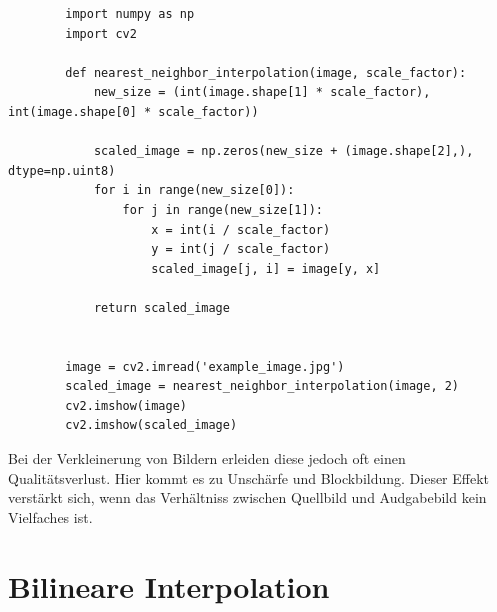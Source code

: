        \begin{acronym}
        \end{acronym}
        \begin{lstlisting}
        import numpy as np
        import cv2
        
        def nearest_neighbor_interpolation(image, scale_factor):
            new_size = (int(image.shape[1] * scale_factor), int(image.shape[0] * scale_factor))
            
            scaled_image = np.zeros(new_size + (image.shape[2],), dtype=np.uint8)
            for i in range(new_size[0]):
                for j in range(new_size[1]):
                    x = int(i / scale_factor)
                    y = int(j / scale_factor)
                    scaled_image[j, i] = image[y, x]
            
            return scaled_image
        
        
        image = cv2.imread('example_image.jpg')
        scaled_image = nearest_neighbor_interpolation(image, 2)
        cv2.imshow(image)
        cv2.imshow(scaled_image)
        \end{lstlisting}

        Bei der Verkleinerung von Bildern erleiden diese jedoch oft einen Qualitätsverlust.
        Hier kommt es zu Unschärfe und Blockbildung.
        Dieser Effekt verstärkt sich, wenn das Verhältniss zwischen Quellbild und Audgabebild kein Vielfaches ist.

    \section{Bilineare Interpolation}
    

    

